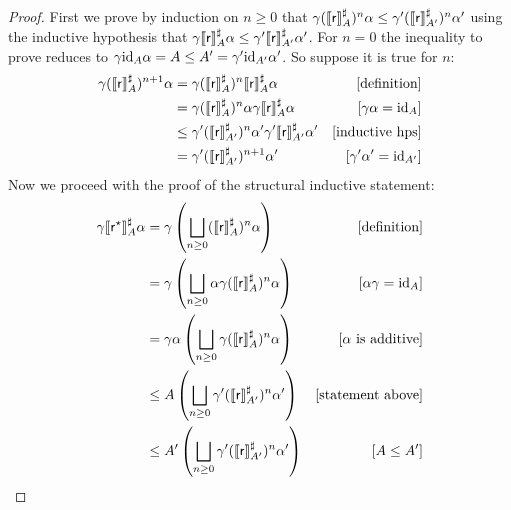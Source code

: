 \begin{proof}
	\proofcase{($\regr^{\kstar}$)}
	First we prove by induction on $n \ge 0$ that $\gamma (\llbracket\mathsf{r}\rrbracket^{\sharp}_{A})^n \alpha \le \gamma' (\llbracket\mathsf{r}\rrbracket^{\sharp}_{A'})^n \alpha'$ using the inductive hypothesis that $\gamma \llbracket\mathsf{r}\rrbracket^{\sharp}_{A} \alpha \le \gamma' \llbracket\mathsf{r}\rrbracket^{\sharp}_{A'} \alpha'$. For $n = 0$ the inequality to prove reduces to $\gamma \text{id}_A \alpha = A \le A' = \gamma' \text{id}_{A'} \alpha'$. So suppose it is true for $n$:
	\begin{align*}
		\gamma (\llbracket\mathsf{r}\rrbracket^{\sharp}_{A})^{n+1} \alpha & = \gamma (\llbracket\mathsf{r}\rrbracket^{\sharp}_{A})^n \llbracket\mathsf{r}\rrbracket^{\sharp}_{A} \alpha                       & [\text{definition}]          \\
		                                                 & = \gamma (\llbracket\mathsf{r}\rrbracket^{\sharp}_{A})^n \alpha \gamma \llbracket\mathsf{r}\rrbracket^{\sharp}_{A} \alpha         & [\gamma \alpha = \text{id}_A]      \\
		                                                 & \le \gamma' (\llbracket\mathsf{r}\rrbracket^{\sharp}_{A'})^n \alpha' \gamma' \llbracket\mathsf{r}\rrbracket^{\sharp}_{A'} \alpha' & [\text{inductive hps}]       \\
		                                                 & = \gamma' (\llbracket\mathsf{r}\rrbracket^{\sharp}_{A'})^{n+1} \alpha'                                           & [\gamma' \alpha' = \text{id}_{A'}]
	\end{align*}
	Now we proceed with the proof of the structural inductive statement:
	\begin{align*}
		\gamma \denot{\regr^\kstar}^{\sharp}_{A} \alpha & = \gamma \left( \bigsqcup_{n \ge 0} (\denot{\regr}^{\sharp}_{A})^n \alpha \right)                    & [\text{definition}]           \\
		                                                & = \gamma \left( \bigsqcup_{n \ge 0} \alpha \gamma (\denot{\regr}^{\sharp}_{A})^n \alpha \right)      & [\alpha \gamma = \id_A]       \\
		                                                & = \gamma \alpha \left( \bigsqcup_{n \ge 0} \gamma (\denot{\regr}^{\sharp}_{A})^n \alpha \right)      & [\alpha \text{ is additive}]  \\
		                                                & \le A \left( \bigsqcup_{n \ge 0} \gamma' (\denot{\regr}^{\sharp}_{A'})^n \alpha' \right)             & [\text{statement above}]      \\
		                                                & \le A' \left( \bigsqcup_{n \ge 0} \gamma' (\denot{\regr}^{\sharp}_{A'})^n \alpha' \right)            & [A \le A']                    \\

\end{align*}
\end{proof}
